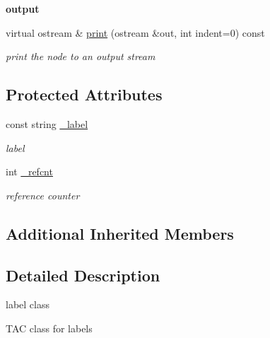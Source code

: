 \begin{Indent}{\bf output}\par
\begin{DoxyCompactItemize}
\item 
virtual ostream \& \hyperlink{classCTacLabel_a45ccdb466dda48890594a82fec365e5a}{print} (ostream \&out, int indent=0) const 
\begin{DoxyCompactList}\small\item\em print the node to an output stream \end{DoxyCompactList}\end{DoxyCompactItemize}
\end{Indent}
\subsection*{Protected Attributes}
\begin{DoxyCompactItemize}
\item 
\hypertarget{classCTacLabel_a9ddf8f0419e0d2c83d6269216e165677}{const string \hyperlink{classCTacLabel_a9ddf8f0419e0d2c83d6269216e165677}{\-\_\-label}}\label{classCTacLabel_a9ddf8f0419e0d2c83d6269216e165677}

\begin{DoxyCompactList}\small\item\em label \end{DoxyCompactList}\item 
\hypertarget{classCTacLabel_a741b0f1fee25b2af27ada61cb78cc299}{int \hyperlink{classCTacLabel_a741b0f1fee25b2af27ada61cb78cc299}{\-\_\-refcnt}}\label{classCTacLabel_a741b0f1fee25b2af27ada61cb78cc299}

\begin{DoxyCompactList}\small\item\em reference counter \end{DoxyCompactList}\end{DoxyCompactItemize}
\subsection*{Additional Inherited Members}


\subsection{Detailed Description}
label class 

T\-A\-C class for labels 


